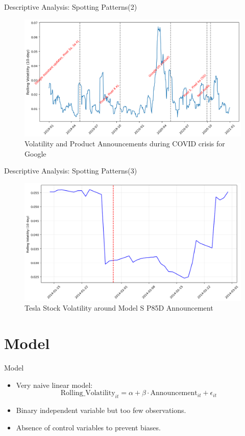 \documentclass{beamer}
\begin{document}
\begin{frame}{Descriptive Analysis: Spotting Patterns(2)}
  
\begin{figure}
    \centering
    \includegraphics[width=0.8\linewidth]{../images/GOOG_pattern.png}
    \caption{Volatility and Product Announcements during COVID crisis for Google}
    \label{fig:GOOG_pattern}
\end{figure}
    
\end{frame}

\begin{frame}{Descriptive Analysis: Spotting Patterns(3)}
  
\begin{figure}
    \centering
    \includegraphics[width=0.8\linewidth]{../images/TESLA_pattern.png}
    \caption{Tesla Stock Volatility around Model S P85D Announcement}
    \label{fig:TESLA_pattern}
\end{figure}
    
\end{frame}


\section{Model}

\begin{frame}{Model}
  \begin{itemize}
    \item Very naive linear model:
    \[
    \text{Rolling\_Volatility}_{it} = \alpha + \beta \cdot \text{Announcement}_{it} + \epsilon_{it}
    \]
    \item Binary independent variable but too few observations.
    \item Absence of control variables to prevent biases.
  \end{itemize}
\end{frame}
\end{document}
